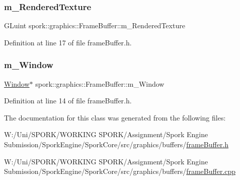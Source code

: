 \subsubsection{\texorpdfstring{m\+\_\+\+Rendered\+Texture}{m\_RenderedTexture}}
{\footnotesize\ttfamily G\+Luint spork\+::graphics\+::\+Frame\+Buffer\+::m\+\_\+\+Rendered\+Texture\hspace{0.3cm}{\ttfamily [private]}}



Definition at line 17 of file frame\+Buffer.\+h.

\mbox{\label{classspork_1_1graphics_1_1_frame_buffer_aeba86bc3c16a729e0ee0046c0d227dd4}} 
\subsubsection{\texorpdfstring{m\+\_\+\+Window}{m\_Window}}
{\footnotesize\ttfamily \hyperlink{classspork_1_1graphics_1_1_window}{Window}$\ast$ spork\+::graphics\+::\+Frame\+Buffer\+::m\+\_\+\+Window\hspace{0.3cm}{\ttfamily [private]}}



Definition at line 14 of file frame\+Buffer.\+h.



The documentation for this class was generated from the following files\+:\begin{DoxyCompactItemize}
\item 
W\+:/\+Uni/\+S\+P\+O\+R\+K/\+W\+O\+R\+K\+I\+N\+G S\+P\+O\+R\+K/\+Assignment/\+Spork Engine Submission/\+Spork\+Engine/\+Spork\+Core/src/graphics/buffers/\hyperlink{frame_buffer_8h}{frame\+Buffer.\+h}\item 
W\+:/\+Uni/\+S\+P\+O\+R\+K/\+W\+O\+R\+K\+I\+N\+G S\+P\+O\+R\+K/\+Assignment/\+Spork Engine Submission/\+Spork\+Engine/\+Spork\+Core/src/graphics/buffers/\hyperlink{frame_buffer_8cpp}{frame\+Buffer.\+cpp}\end{DoxyCompactItemize}

